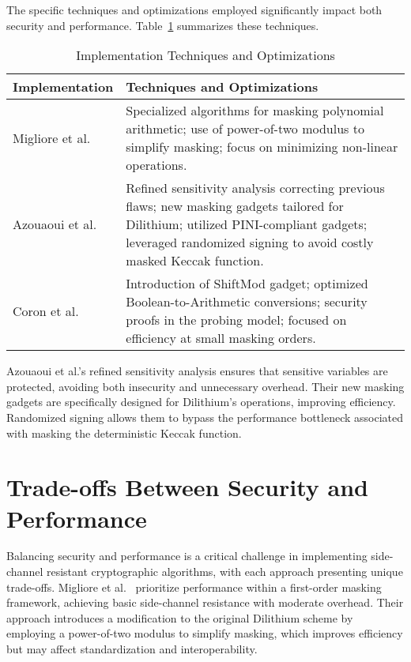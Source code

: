 The specific techniques and optimizations employed significantly impact both security and performance. Table~\ref{tab:implementation_techniques} summarizes these techniques.

\begin{table}[h]
    \centering
    \renewcommand{\arraystretch}{1.2} %
    \caption{Implementation Techniques and Optimizations}
    \begin{tabular}{l | p{11cm}} %
        \toprule
        \textbf{Implementation}            & \textbf{Techniques and Optimizations}                                                                                                                                                                     \\
        \midrule
        Migliore et al.\ \cite{Migliore19} & Specialized algorithms for masking polynomial arithmetic; use of power-of-two modulus to simplify masking; focus on minimizing non-linear operations.                                                     \\
        Azouaoui et al.\ \cite{Azouaoui22} & Refined sensitivity analysis correcting previous flaws; new masking gadgets tailored for Dilithium; utilized PINI-compliant gadgets; leveraged randomized signing to avoid costly masked Keccak function. \\
        Coron et al.\ \cite{Coron23}       & Introduction of ShiftMod gadget; optimized Boolean-to-Arithmetic conversions; security proofs in the probing model; focused on efficiency at small masking orders.                                        \\
        \bottomrule
    \end{tabular}
    \label{tab:implementation_techniques}
\end{table}


Azouaoui et al.'s refined sensitivity analysis ensures that sensitive variables are protected, avoiding both insecurity and unnecessary overhead. Their new masking gadgets are specifically designed for Dilithium's operations, improving efficiency. Randomized signing allows them to bypass the performance bottleneck associated with masking the deterministic Keccak function.

\section{Trade-offs Between Security and Performance}

Balancing security and performance is a critical challenge in implementing side-channel resistant cryptographic algorithms, with each approach presenting unique trade-offs. Migliore et al.\ \cite{Migliore19} prioritize performance within a first-order masking framework, achieving basic side-channel resistance with moderate overhead. Their approach introduces a modification to the original Dilithium scheme by employing a power-of-two modulus to simplify masking, which improves efficiency but may affect standardization and interoperability.

